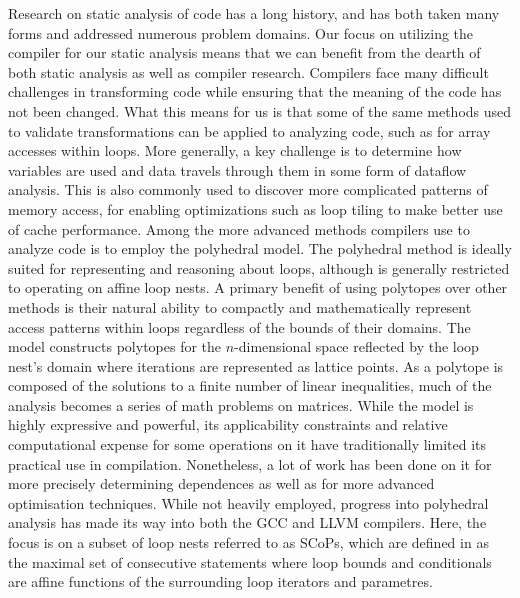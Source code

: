 Research on static analysis of code has a long history, and has both taken many forms and addressed numerous problem domains\cite{Andrade:2012:SAW:2355585.2355593}\cite{1194988}.
Our focus on utilizing the compiler for our static analysis means that we can benefit from the dearth of both static analysis as well as compiler research.
Compilers face many difficult challenges in transforming code while ensuring that the meaning of the code has not been changed.
What this means for us is that some of the same methods used to validate transformations can be applied to analyzing code, such as for array accesses within loops.
More generally, a key challenge is to determine how variables are used and data travels through them in some form of dataflow analysis\cite{Feautrier1991}.
This is also commonly used to discover more complicated patterns of memory access, for enabling optimizations such as loop tiling to make better use of cache performance.
Among the more advanced methods compilers use to analyze code is to employ the polyhedral model\cite{Cousot:1978:ADL:512760.512770}\cite{Bagnara:2009:APC:1628316.1628385}\cite{benabderrahmane.10.cc}.
The polyhedral method is ideally suited for representing and reasoning about loops, although is generally restricted to operating on affine loop nests.
A primary benefit of using polytopes over other methods is their natural ability to compactly and mathematically represent access patterns within loops regardless of the bounds of their domains.
The model constructs polytopes for the $n$-dimensional space reflected by the loop nest's domain where iterations are represented as lattice points.
As a polytope is composed of the solutions to a finite number of linear inequalities, much of the analysis becomes a series of math problems on matrices.
While the model is highly expressive and powerful, its applicability constraints and relative computational expense for some operations on it have traditionally limited its practical use in compilation\cite{DBLP:journals/entcs/Simon10a}.
Nonetheless, a lot of work has been done on it for more precisely determining dependences\cite{Vasilache:2006:VDA:1183401.1183448} as well as for more advanced optimisation techniques\cite{Nieuwenhuizen2014AutovectorizationUP}\cite{5260526}.
While not heavily employed, progress into polyhedral analysis has made its way into both the \ac{GCC}\cite{trifunovic:inria-00551516} and LLVM\cite{grosser.11.impact} compilers.
Here, the focus is on a subset of loop nests referred to as \acp{SCoP}\cite{TBas}, which are defined in \cite{benabderrahmane.10.cc} as the maximal set of consecutive statements where loop bounds and conditionals are affine functions of the surrounding loop iterators and parametres.


